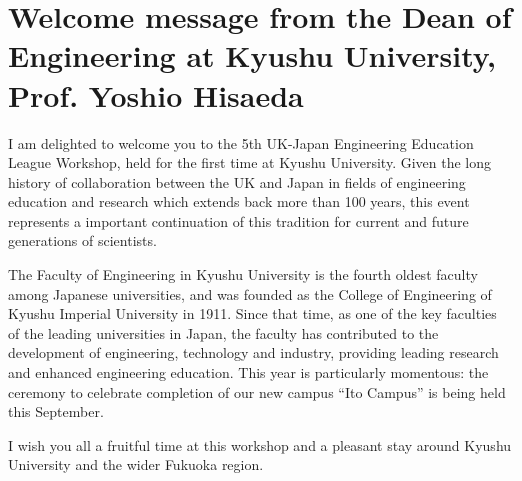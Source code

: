 \section[Welcome message]{Welcome message from the Dean of Engineering at Kyushu University, Prof. Yoshio Hisaeda}

I am delighted to welcome you to the 5th UK-Japan Engineering Education League Workshop, held for the first time at Kyushu University. Given the long history of collaboration between the UK and Japan in fields of engineering education and research which extends back more than 100 years, this event represents a important continuation of this tradition for current and future generations of scientists.
 
The Faculty of Engineering in Kyushu University is the fourth oldest faculty among Japanese universities, and was founded as the College of Engineering of Kyushu Imperial University in 1911. Since that time, as one of the key faculties of the leading universities in Japan, the faculty has contributed to the development of engineering, technology and industry, providing leading research and enhanced engineering education. This year is particularly momentous: the ceremony to celebrate completion of our new campus ``Ito Campus'' is being held this September.

I wish you all a fruitful time at this workshop and a pleasant stay around Kyushu University and the wider Fukuoka region.
